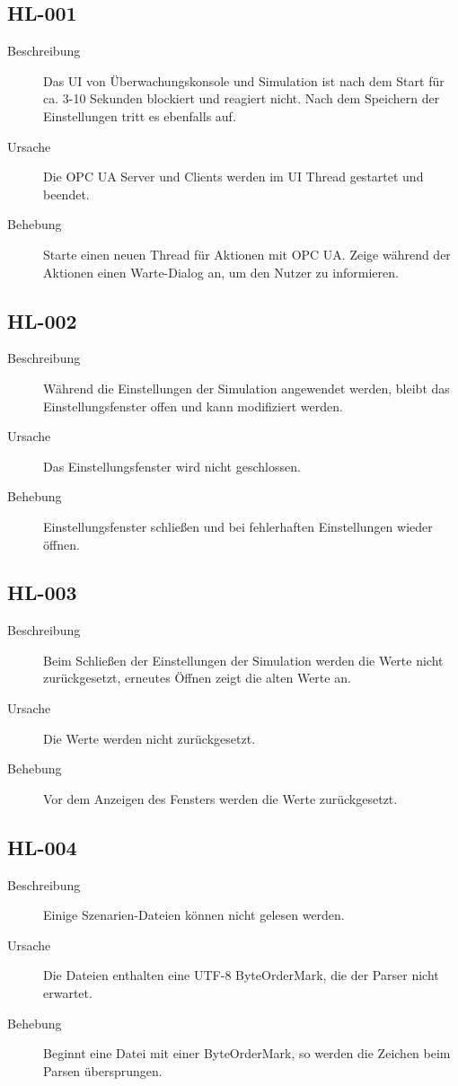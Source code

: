 \documentclass[parskip=full]{scrartcl}
\begin{document}
\subsection{HL-001}
\begin{description}
	\item[Beschreibung] Das UI von Überwachungskonsole und Simulation ist nach dem Start für ca. 3-10 Sekunden blockiert und reagiert nicht. Nach dem Speichern der Einstellungen tritt es ebenfalls auf.
	\item[Ursache] Die OPC UA Server und Clients werden im UI Thread gestartet und beendet.
	\item[Behebung] Starte einen neuen Thread für Aktionen mit OPC UA. Zeige während der Aktionen einen Warte-Dialog an, um den Nutzer zu informieren.
\end{description}

\subsection{HL-002}
\begin{description}
	\item[Beschreibung] Während die Einstellungen der Simulation angewendet werden, bleibt das Einstellungsfenster offen und kann modifiziert werden.
	\item[Ursache] Das Einstellungsfenster wird nicht geschlossen.
	\item[Behebung] Einstellungsfenster schließen und bei fehlerhaften Einstellungen wieder öffnen.
\end{description}

\subsection{HL-003}
\begin{description}
	\item[Beschreibung] Beim Schließen der Einstellungen der Simulation werden die Werte nicht zurückgesetzt, erneutes Öffnen zeigt die alten Werte an.
	\item[Ursache] Die Werte werden nicht zurückgesetzt.
	\item[Behebung] Vor dem Anzeigen des Fensters werden die Werte zurückgesetzt.
\end{description}

\subsection{HL-004}
\begin{description}
	\item[Beschreibung] Einige Szenarien-Dateien können nicht gelesen werden.
	\item[Ursache] Die Dateien enthalten eine UTF-8 ByteOrderMark, die der Parser nicht erwartet.
	\item[Behebung] Beginnt eine Datei mit einer ByteOrderMark, so werden die Zeichen beim Parsen übersprungen.
\end{description}
\end{document}
